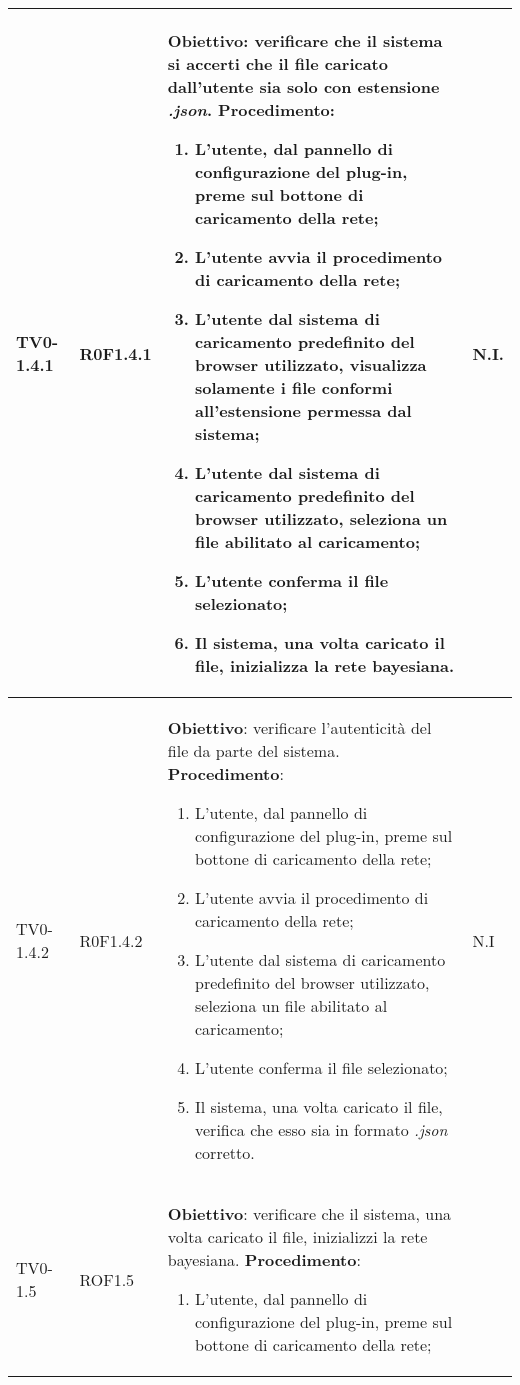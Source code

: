 \begin{longtable}{|m{}|m{}|m{}|m{}|}
\rowcolor{grigio} TV0-1.4.1 & R0F1.4.1 &
	\textbf{Obiettivo}: verificare che il sistema si accerti che il file caricato dall'utente sia solo con estensione \textit{.json}. \newline
	\textbf{Procedimento}:
	\begin{enumerate}
		\item L'utente, dal pannello di configurazione del plug-in, preme sul bottone di caricamento della rete;
		\item L'utente avvia il procedimento di caricamento della rete;
		\item L'utente dal sistema di caricamento predefinito del browser utilizzato, visualizza solamente i file conformi all'estensione permessa dal sistema;
		\item L'utente dal sistema di caricamento predefinito del browser utilizzato, seleziona un file abilitato al caricamento;
		\item L'utente conferma il file selezionato;
		\item Il sistema, una volta caricato il file, inizializza la rete bayesiana.
	\end{enumerate}
	& N.I. \\
\hline
TV0-1.4.2 & R0F1.4.2 &
	\textbf{Obiettivo}: verificare l'autenticità del file da parte del sistema. \newline
	\textbf{Procedimento}:
	\begin{enumerate}
		\item L'utente, dal pannello di configurazione del plug-in, preme sul bottone di caricamento della rete;
		\item L'utente avvia il procedimento di caricamento della rete;
		\item L'utente dal sistema di caricamento predefinito del browser utilizzato, seleziona un file abilitato al caricamento;
		\item L'utente conferma il file selezionato;
		\item Il sistema, una volta caricato il file, verifica che esso sia in formato \textit{.json} corretto.
	\end{enumerate}
	& N.I \\
\hline
\rowcolor{grigio} TV0-1.5 & ROF1.5 &
	\textbf{Obiettivo}: verificare che il sistema, una volta caricato il file, inizializzi la rete bayesiana. \newline
	\textbf{Procedimento}:
	\begin{enumerate}
		\item L'utente, dal pannello di configurazione del plug-in, preme sul bottone di caricamento della rete;

\end{enumerate}
\end{longtable}
